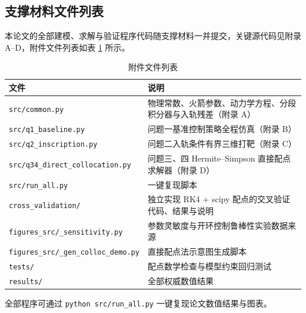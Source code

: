 \documentclass[withoutpreface,bwprint]{cumcmthesis}
\begin{document}
\newpage
\begin{appendices}
\section{支撑材料文件列表}
本论文的全部建模、求解与验证程序代码随支撑材料一并提交，关键源代码见附录 A--D，附件文件列表如表 \ref{tab:appendix-files} 所示。

\begin{table}[!htbp]
\caption{附件文件列表}
\label{tab:appendix-files}
\centering
\begin{tabular}{p{}|p{}}
\toprule[1.5pt]
文件 & 说明 \\
\midrule[1pt]
\texttt{src/common.py} & 物理常数、火箭参数、动力学方程、分段积分器与入轨残差（附录 A） \\
\texttt{src/q1\_baseline.py} & 问题一基准控制策略全程仿真（附录 B） \\
\texttt{src/q2\_inscription.py} & 问题二入轨条件有界三维打靶（附录 C） \\
\texttt{src/q34\_direct\_collocation.py} & 问题三、四 Hermite--Simpson 直接配点求解器（附录 D） \\
\texttt{src/run\_all.py} & 一键复现脚本 \\
\texttt{cross\_validation/} & 独立实现 RK4 + scipy 配点的交叉验证代码、结果与说明 \\
\texttt{figures\_src/\_sensitivity.py} & 参数灵敏度与开环控制鲁棒性实验数据来源 \\
\texttt{figures\_src/\_gen\_colloc\_demo.py} & 直接配点法示意图生成脚本 \\
\texttt{tests/} & 配点数学检查与模型约束回归测试 \\
\texttt{results/} & 全部权威数值结果 \\
\bottomrule[1.5pt]
\end{tabular}
\end{table}

全部程序可通过 \texttt{python src/run\_all.py} 一键复现论文数值结果与图表。


\end{appendices}
\end{document}
